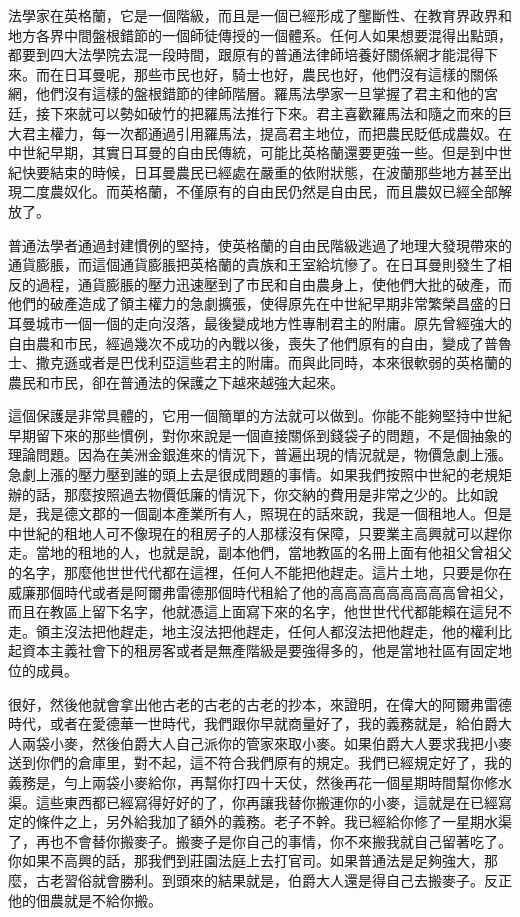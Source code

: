 法學家在英格蘭，它是一個階級，而且是一個已經形成了壟斷性、在教育界政界和地方各界中間盤根錯節的一個師徒傳授的一個體系。任何人如果想要混得出點頭，都要到四大法學院去混一段時間，跟原有的普通法律師培養好關係網才能混得下來。而在日耳曼呢，那些市民也好，騎士也好，農民也好，他們沒有這樣的關係網，他們沒有這樣的盤根錯節的律師階層。羅馬法學家一旦掌握了君主和他的宮廷，接下來就可以勢如破竹的把羅馬法推行下來。君主喜歡羅馬法和隨之而來的巨大君主權力，每一次都通過引用羅馬法，提高君主地位，而把農民貶低成農奴。在中世紀早期，其實日耳曼的自由民傳統，可能比英格蘭還要更強一些。但是到中世紀快要結束的時候，日耳曼農民已經處在嚴重的依附狀態，在波蘭那些地方甚至出現二度農奴化。而英格蘭，不僅原有的自由民仍然是自由民，而且農奴已經全部解放了。

普通法學者通過封建慣例的堅持，使英格蘭的自由民階級逃過了地理大發現帶來的通貨膨脹，而這個通貨膨脹把英格蘭的貴族和王室給坑慘了。在日耳曼則發生了相反的過程，通貨膨脹的壓力迅速壓到了市民和自由農身上，使他們大批的破產，而他們的破產造成了領主權力的急劇擴張，使得原先在中世紀早期非常繁榮昌盛的日耳曼城市一個一個的走向沒落，最後變成地方性專制君主的附庸。原先曾經強大的自由農和市民，經過幾次不成功的內戰以後，喪失了他們原有的自由，變成了普魯士、撒克遜或者是巴伐利亞這些君主的附庸。而與此同時，本來很軟弱的英格蘭的農民和市民，卻在普通法的保護之下越來越強大起來。

這個保護是非常具體的，它用一個簡單的方法就可以做到。你能不能夠堅持中世紀早期留下來的那些慣例，對你來說是一個直接關係到錢袋子的問題，不是個抽象的理論問題。因為在美洲金銀進來的情況下，普遍出現的情況就是，物價急劇上漲。急劇上漲的壓力壓到誰的頭上去是很成問題的事情。如果我們按照中世紀的老規矩辦的話，那麼按照過去物價低廉的情況下，你交納的費用是非常之少的。比如說是，我是德文郡的一個副本產業所有人，照現在的話來說，我是一個租地人。但是中世紀的租地人可不像現在的租房子的人那樣沒有保障，只要業主高興就可以趕你走。當地的租地的人，也就是說，副本他們，當地教區的名冊上面有他祖父曾祖父的名字，那麼他世世代代都在這裡，任何人不能把他趕走。這片土地，只要是你在威廉那個時代或者是阿爾弗雷德那個時代租給了他的高高高高高高高高高曾祖父，而且在教區上留下名字，他就憑這上面寫下來的名字，他世世代代都能賴在這兒不走。領主沒法把他趕走，地主沒法把他趕走，任何人都沒法把他趕走，他的權利比起資本主義社會下的租房客或者是無產階級是要強得多的，他是當地社區有固定地位的成員。

很好，然後他就會拿出他古老的古老的古老的抄本，來證明，在偉大的阿爾弗雷德時代，或者在愛德華一世時代，我們跟你早就商量好了，我的義務就是，給伯爵大人兩袋小麥，然後伯爵大人自己派你的管家來取小麥。如果伯爵大人要求我把小麥送到你們的倉庫里，對不起，這不符合我們原有的規定。我們已經規定好了，我的義務是，勻上兩袋小麥給你，再幫你打四十天仗，然後再花一個星期時間幫你修水渠。這些東西都已經寫得好好的了，你再讓我替你搬運你的小麥，這就是在已經寫定的條件之上，另外給我加了額外的義務。老子不幹。我已經給你修了一星期水渠了，再也不會替你搬麥子。搬麥子是你自己的事情，你不來搬我就自己留著吃了。你如果不高興的話，那我們到莊園法庭上去打官司。如果普通法是足夠強大，那麼，古老習俗就會勝利。到頭來的結果就是，伯爵大人還是得自己去搬麥子。反正他的佃農就是不給你搬。

